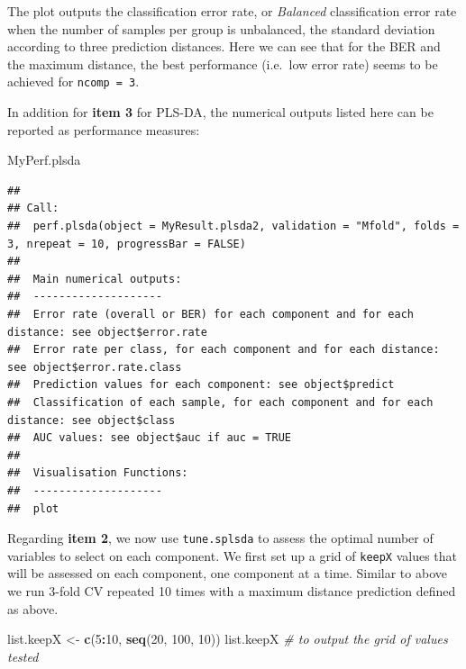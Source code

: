 \documentclass[]{book}
\newenvironment{Shaded}{\begin{snugshade}}{\end{snugshade}}
\newcommand{\KeywordTok}[1]{\textcolor[rgb]{0.13,0.29,0.53}{\textbf{#1}}}
\newcommand{\DecValTok}[1]{\textcolor[rgb]{0.00,0.00,0.81}{#1}}
\newcommand{\StringTok}[1]{\textcolor[rgb]{0.31,0.60,0.02}{#1}}
\newcommand{\CommentTok}[1]{\textcolor[rgb]{0.56,0.35,0.01}{\textit{#1}}}
\newcommand{\OperatorTok}[1]{\textcolor[rgb]{0.81,0.36,0.00}{\textbf{#1}}}
\newcommand{\NormalTok}[1]{#1}
\theoremstyle{definition}
\theoremstyle{definition}
\theoremstyle{definition}
\theoremstyle{remark}
\begin{document}
The plot outputs the classification error rate, or \emph{Balanced}
classification error rate when the number of samples per group is
unbalanced, the standard deviation according to three prediction
distances. Here we can see that for the BER and the maximum distance,
the best performance (i.e.~low error rate) seems to be achieved for
\texttt{ncomp\ =\ 3}.

In addition for \textbf{item 3} for PLS-DA, the numerical outputs listed
here can be reported as performance measures:

\begin{Shaded}
\begin{Highlighting}[]
\NormalTok{MyPerf.plsda}
\end{Highlighting}
\end{Shaded}

\begin{verbatim}
## 
## Call:
##  perf.plsda(object = MyResult.plsda2, validation = "Mfold", folds = 3, nrepeat = 10, progressBar = FALSE) 
## 
##  Main numerical outputs: 
##  -------------------- 
##  Error rate (overall or BER) for each component and for each distance: see object$error.rate 
##  Error rate per class, for each component and for each distance: see object$error.rate.class 
##  Prediction values for each component: see object$predict 
##  Classification of each sample, for each component and for each distance: see object$class 
##  AUC values: see object$auc if auc = TRUE 
## 
##  Visualisation Functions: 
##  -------------------- 
##  plot
\end{verbatim}

Regarding \textbf{item 2}, we now use \texttt{tune.splsda} to assess the
optimal number of variables to select on each component. We first set up
a grid of \texttt{keepX} values that will be assessed on each component,
one component at a time. Similar to above we run 3-fold CV repeated 10
times with a maximum distance prediction defined as above.

\begin{Shaded}
\begin{Highlighting}[]
\NormalTok{list.keepX <-}\StringTok{ }\KeywordTok{c}\NormalTok{(}\DecValTok{5}\OperatorTok{:}\DecValTok{10}\NormalTok{,  }\KeywordTok{seq}\NormalTok{(}\DecValTok{20}\NormalTok{, }\DecValTok{100}\NormalTok{, }\DecValTok{10}\NormalTok{))}
\NormalTok{list.keepX }\CommentTok{# to output the grid of values tested}
\end{Highlighting}
\end{Shaded}
\end{document}
